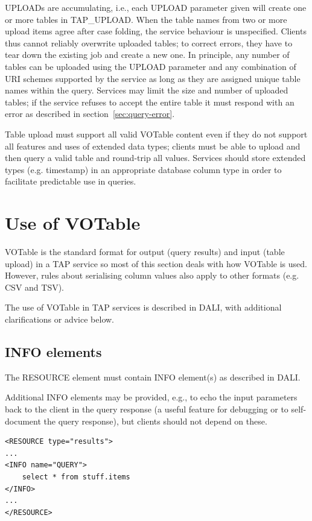 \documentclass[11pt,letter]{ivoa}
\newcommand{\tapupload}{TAP\_UPLOAD}
\newcommand{\tapupload}{%
  {\relsize{-0.5}TAP\discretionary{-}{}{\kern-2pt\_}UPLOAD}}
\begin{document}
UPLOADs are accumulating, i.e., each UPLOAD parameter given will create one or 
more tables in \tapupload. When the table names from two or more 
upload items agree after case folding, the service behaviour is unspecified. 
Clients thus cannot reliably overwrite uploaded tables; to correct errors, they 
have to tear down the existing job and create a new one. In principle, any 
number of tables can be uploaded using the UPLOAD parameter and any combination 
of URI schemes supported by the service as long as they are assigned unique 
table names within the query. Services may limit the size and number of 
uploaded tables; if the service refuses to accept the entire table it must 
respond with an error as described in section~\ref{sec:query-error}.

Table upload must support all valid VOTable content even if they do not support 
all features and uses of extended data types; clients must be able to upload and then
query a valid table and round-trip all values. Services should store extended types (e.g. 
timestamp) in an appropriate database column type in order to facilitate predictable use 
in queries.

\section{Use of VOTable}
\label{sec:votable}

VOTable \citep{2013ivoa.spec.0920O} is the standard format for output (query 
results) and input (table upload) in a TAP service so most of this section 
deals with how VOTable is used. However, rules about serialising column values 
also apply to other formats (e.g. CSV and TSV).

The use of VOTable in TAP services is described in DALI, with additional clarifications
or advice below.

\subsection{INFO elements}
\label{sec:vot-info}

The RESOURCE element must contain INFO element(s) as described in DALI.

Additional INFO elements may be provided, e.g., to echo the input parameters 
back to the client in the query response (a useful feature for debugging or to 
self-document the query response), but clients should not depend on these. 

\begin{verbatim}
<RESOURCE type="results">
...
<INFO name="QUERY">
    select * from stuff.items
</INFO>
...
</RESOURCE>
\end{verbatim}
\end{document}
